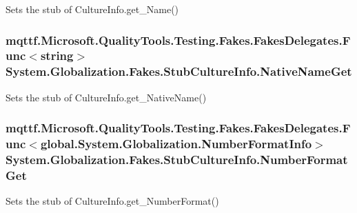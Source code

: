 Sets the stub of Culture\-Info.\-get\-\_\-\-Name()

\hypertarget{class_system_1_1_globalization_1_1_fakes_1_1_stub_culture_info_a35c1a9089b00ad3bcf8a3ce808b2bb68}{
\subsubsection[{Native\-Name\-Get}]{\setlength{\rightskip}{0pt plus 5cm}mqttf.\-Microsoft.\-Quality\-Tools.\-Testing.\-Fakes.\-Fakes\-Delegates.\-Func$<$string$>$ System.\-Globalization.\-Fakes.\-Stub\-Culture\-Info.\-Native\-Name\-Get}}\label{class_system_1_1_globalization_1_1_fakes_1_1_stub_culture_info_a35c1a9089b00ad3bcf8a3ce808b2bb68}


Sets the stub of Culture\-Info.\-get\-\_\-\-Native\-Name()

\hypertarget{class_system_1_1_globalization_1_1_fakes_1_1_stub_culture_info_a2f41a53606509e599eb9d5b52a87b13f}{
\subsubsection[{Number\-Format\-Get}]{\setlength{\rightskip}{0pt plus 5cm}mqttf.\-Microsoft.\-Quality\-Tools.\-Testing.\-Fakes.\-Fakes\-Delegates.\-Func$<$global.\-System.\-Globalization.\-Number\-Format\-Info$>$ System.\-Globalization.\-Fakes.\-Stub\-Culture\-Info.\-Number\-Format\-Get}}\label{class_system_1_1_globalization_1_1_fakes_1_1_stub_culture_info_a2f41a53606509e599eb9d5b52a87b13f}


Sets the stub of Culture\-Info.\-get\-\_\-\-Number\-Format()

